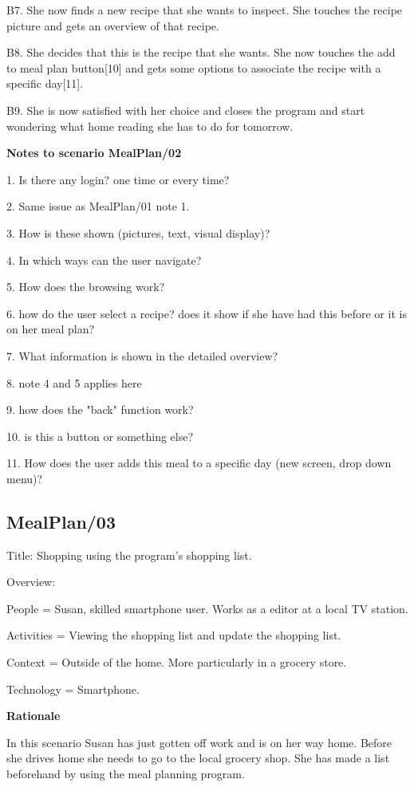 	B7. She now finds a new recipe that she wants to inspect. She touches the recipe picture and gets an overview of that recipe. 

	B8. She decides that this is the recipe that she wants. She now touches the add to meal plan button[10] and gets some options to associate the recipe with a specific day[11].

	B9. She is now satisfied with her choice and closes the program and start wondering what home reading she has to do for tomorrow.
	
\textbf{Notes to scenario MealPlan/02}

1. Is there any login? one time or every time?

2. Same issue as MealPlan/01 note 1.

3. How is these shown (pictures, text, visual display)?

4. In which ways can the user navigate?

5. How does the browsing work?

6. how do the user select a recipe? does it show if she have had this before or it is on her meal 
plan?

7. What information is shown in the detailed overview?

8. note 4 and 5 applies here

9. how does the "back" function work?

10. is this a button or something else?

11. How does the user adds this meal to a specific day (new screen, drop down menu)?

\subsection{MealPlan/03} \label{MealPlan03}

Title: Shopping using the program's shopping list.

Overview:

	People = Susan, skilled smartphone user. Works as a editor at a local TV station. 
	
	Activities = Viewing the shopping list and update the shopping list.

	Context = Outside of the home. More particularly in a grocery store.

	Technology = Smartphone.
	
\textbf{Rationale}

In this scenario Susan has just gotten off work and is on her way home. Before she drives home she needs to go to the local grocery shop. She has made a list beforehand by using the meal planning program.

